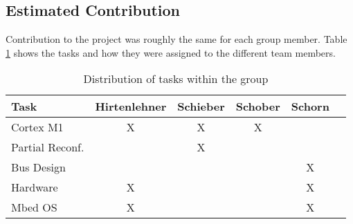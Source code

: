 \subsection{Estimated Contribution}
Contribution to the project was roughly the same for each group member.
Table \ref{tbl:AssignedTasks} shows the tasks and how they were assigned to the different team members.
    \begin{table}
        \centering
\begin{tabular}{ l | c c c c c}
 Task & Hirtenlehner & Schieber & Schober & Schorn\\ 
 \hline
Cortex M1       & X & X & X &   \\
Partial Reconf. &   & X &   &   \\
Bus Design      &   &   &   & X \\
Hardware        & X &   &   & X \\
Mbed OS         & X &   &   & X \\
\end{tabular}
\caption{Distribution of tasks within the group}
\label{tbl:AssignedTasks}
\end{table}